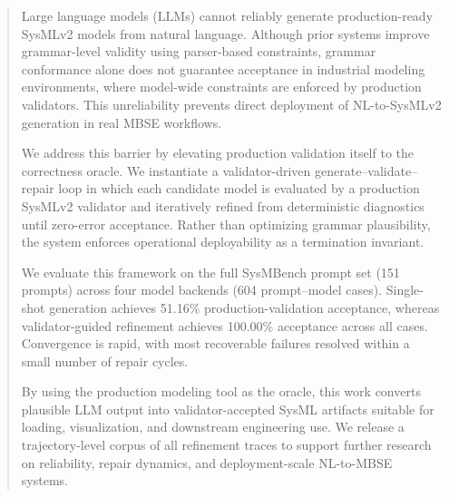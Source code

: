 \documentclass[colorlinks,upint,subscriptcorrection,varvw,hyphenate,balance]{asmeconf} %
\begin{document}





\begin{abstract}
Large language models (LLMs) cannot reliably generate production-ready SysMLv2 models from natural language. Although prior systems improve grammar-level validity using parser-based constraints, grammar conformance alone does not guarantee acceptance in industrial modeling environments, where model-wide constraints are enforced by production validators. This unreliability prevents direct deployment of NL-to-SysMLv2 generation in real MBSE workflows.

We address this barrier by elevating production validation itself to the correctness oracle. We instantiate a validator-driven generate--validate--repair loop in which each candidate model is evaluated by a production SysMLv2 validator and iteratively refined from deterministic diagnostics until zero-error acceptance. Rather than optimizing grammar plausibility, the system enforces operational deployability as a termination invariant.

We evaluate this framework on the full SysMBench prompt set (151 prompts) across four model backends (604 prompt--model cases). Single-shot generation achieves 51.16\% production-validation acceptance, whereas validator-guided refinement achieves 100.00\% acceptance across all cases. Convergence is rapid, with most recoverable failures resolved within a small number of repair cycles.

By using the production modeling tool as the oracle, this work converts plausible LLM output into validator-accepted SysML artifacts suitable for loading, visualization, and downstream engineering use. We release a trajectory-level corpus of all refinement traces to support further research on reliability, repair dynamics, and deployment-scale NL-to-MBSE systems.
\end{abstract}
\end{document}
